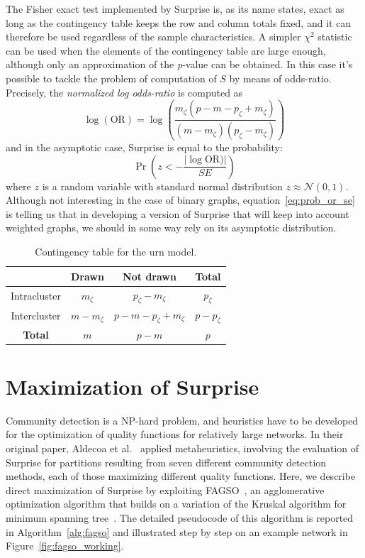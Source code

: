 The Fisher exact test implemented by Surprise is, as its name states, exact as long as the contingency table keeps the row and column totals fixed, and it can therefore be used regardless of the sample characteristics. A simpler $\chi^2$ statistic can be used when the elements of the contingency table are large enough, although only an approximation of the \emph{p}-value can be obtained.
In this case it's possible to tackle the problem of computation of $S$ by means of odds-ratio. Precisely, the \emph{normalized log odds-ratio} is computed as 
\begin{equation}
\log(\textrm{OR}) = \log\left( \frac{m_\zeta(p-m-p_\zeta+m_\zeta)}{(m-m_\zeta)(p_\zeta-m_\zeta)} \right )
\end{equation}
and in the asymptotic case, Surprise is equal to the probability:
\begin{equation}\label{eq:prob_or_se}
\Pr\left(z < -\frac{|\log\textrm{OR})|}{SE} \right)
\end{equation}
where $z$ is a random variable with standard normal distribution $z \approx \mathcal{N}(0,1)$.
Although not interesting in the case of binary graphs, equation~\ref{eq:prob_or_se} is telling us that in developing a version of Surprise that will keep into account weighted graphs, we should in some way rely on its asymptotic distribution.

\begin{table}[htb!]
\centering
\begin{tabular}{|c|c|c|c|}
\hline
 & Drawn & Not drawn & \textbf{Total}\\
\hline
Intracluster & $m_\zeta$ & $p_\zeta-m_\zeta$ & $p_\zeta$\\
\hline
Intercluster & $m-m_\zeta$ & $p-m-p_\zeta+m_\zeta$ & $p-p_\zeta$ \\
\hline
\textbf{Total} & $m$ & $p-m$ & $p$ \\
\hline
\end{tabular}
\caption{Contingency table for the urn model.}
\label{tab:contingency_table}
\end{table}

\section{Maximization of Surprise}\label{sec:max_surprise_fagso}

Community detection is a NP-hard problem, and heuristics have to be developed for the optimization of quality functions for relatively large networks. In their original paper, Aldecoa et al.~\cite{aldecoa2011} applied metaheuristics, involving the evaluation of Surprise for partitions resulting from seven different community detection methods, each of those maximizing different quality functions.
Here, we describe direct maximization of Surprise by exploiting FAGSO~\cite{jiang2014}, an agglomerative optimization algorithm that builds on a variation of the Kruskal algorithm for minimum spanning tree~\cite{leiserson2001}.
The detailed pseudocode of this algorithm is reported in Algorithm~\ref{alg:fagso} and illustrated step by step on an example network in Figure~\ref{fig:fagso_working}.

